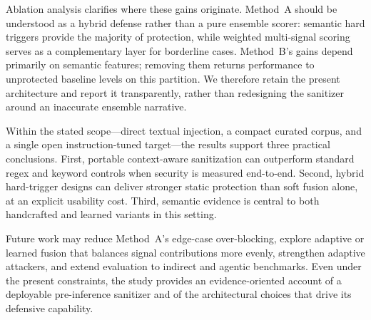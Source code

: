\documentclass{article}
\begin{document}
Ablation analysis clarifies where these gains originate.
Method~A should be understood as a hybrid defense rather than a pure ensemble scorer: semantic hard triggers provide the majority of protection, while weighted multi-signal scoring serves as a complementary layer for borderline cases.
Method~B's gains depend primarily on semantic features; removing them returns performance to unprotected baseline levels on this partition.
We therefore retain the present architecture and report it transparently, rather than redesigning the sanitizer around an inaccurate ensemble narrative.

Within the stated scope---direct textual injection, a compact curated corpus, and a single open instruction-tuned target---the results support three practical conclusions.
First, portable context-aware sanitization can outperform standard regex and keyword controls when security is measured end-to-end.
Second, hybrid hard-trigger designs can deliver stronger static protection than soft fusion alone, at an explicit usability cost.
Third, semantic evidence is central to both handcrafted and learned variants in this setting.

Future work may reduce Method~A's edge-case over-blocking, explore adaptive or learned fusion that balances signal contributions more evenly, strengthen adaptive attackers, and extend evaluation to indirect and agentic benchmarks.
Even under the present constraints, the study provides an evidence-oriented account of a deployable pre-inference sanitizer and of the architectural choices that drive its defensive capability.

\nocite{*}







\end{document}

